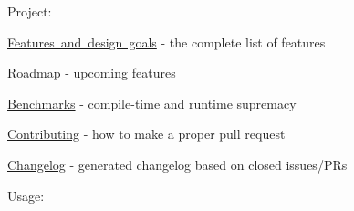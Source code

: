 Project\+:


\begin{DoxyItemize}
\item \mbox{\hyperlink{md__c___users__u_s_e_r_source_repos_bzareva_star_wars_universe_0_1_doctest_doc_markdown_features}{Features and design goals}} -\/ the complete list of features
\item \mbox{\hyperlink{md__c___users__u_s_e_r_source_repos_bzareva_star_wars_universe_0_1_doctest_doc_markdown_roadmap}{Roadmap}} -\/ upcoming features
\item \mbox{\hyperlink{md__c___users__u_s_e_r_source_repos_bzareva_star_wars_universe_0_1_doctest_doc_markdown_benchmarks}{Benchmarks}} -\/ compile-\/time and runtime supremacy
\item \mbox{\hyperlink{md__c___users__u_s_e_r_source_repos_bzareva_star_wars_universe_0_1_doctest__c_o_n_t_r_i_b_u_t_i_n_g}{Contributing}} -\/ how to make a proper pull request
\item \mbox{\hyperlink{md__c___users__u_s_e_r_source_repos_bzareva_star_wars_universe_0_1_doctest__c_h_a_n_g_e_l_o_g}{Changelog}} -\/ generated changelog based on closed issues/\+PRs
\end{DoxyItemize}

Usage\+:


